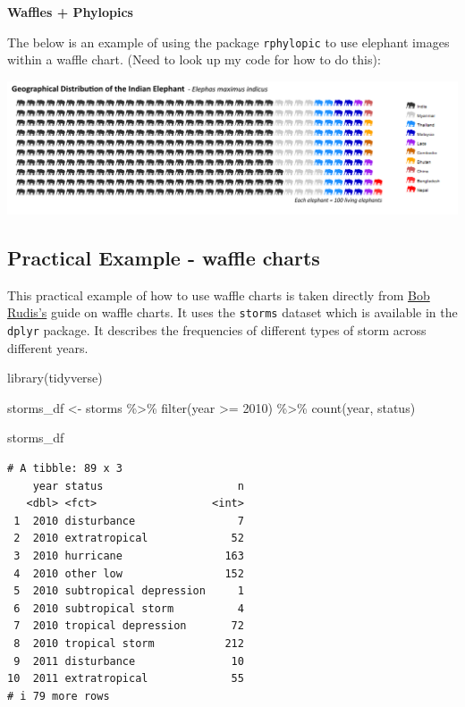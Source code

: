 \documentclass[
  letterpaper,
  DIV=11,
  numbers=noendperiod]{scrreprt}
\newenvironment{Shaded}{\begin{snugshade}}{\end{snugshade}}
\newcommand{\DecValTok}[1]{\textcolor[rgb]{0.68,0.00,0.00}{#1}}
\newcommand{\FunctionTok}[1]{\textcolor[rgb]{0.28,0.35,0.67}{#1}}
\newcommand{\NormalTok}[1]{\textcolor[rgb]{0.00,0.23,0.31}{#1}}
\newcommand{\OtherTok}[1]{\textcolor[rgb]{0.00,0.23,0.31}{#1}}
\newcommand{\SpecialCharTok}[1]{\textcolor[rgb]{0.37,0.37,0.37}{#1}}
\begin{document}
\textbf{Waffles + Phylopics}

The below is an example of using the package \texttt{rphylopic} to use
elephant images within a waffle chart. (Need to look up my code for how
to do this):

\includegraphics{./img/elephant.png}

\hypertarget{practical-example---waffle-charts}{%
\subsection{Practical Example - waffle
charts}\label{practical-example---waffle-charts}}

This practical example of how to use waffle charts is taken directly
from \href{https://rud.is/rpubs/building-waffle-charts.html}{Bob
Rudis's} guide on waffle charts. It uses the \texttt{storms} dataset
which is available in the \texttt{dplyr} package. It describes the
frequencies of different types of storm across different years.

\begin{Shaded}
\begin{Highlighting}[]
\FunctionTok{library}\NormalTok{(tidyverse)}

\NormalTok{storms\_df }\OtherTok{\textless{}{-}}\NormalTok{ storms }\SpecialCharTok{\%\textgreater{}\%}
  \FunctionTok{filter}\NormalTok{(year }\SpecialCharTok{\textgreater{}=} \DecValTok{2010}\NormalTok{) }\SpecialCharTok{\%\textgreater{}\%}
  \FunctionTok{count}\NormalTok{(year, status) }

\NormalTok{storms\_df}
\end{Highlighting}
\end{Shaded}

\begin{verbatim}
# A tibble: 89 x 3
    year status                     n
   <dbl> <fct>                  <int>
 1  2010 disturbance                7
 2  2010 extratropical             52
 3  2010 hurricane                163
 4  2010 other low                152
 5  2010 subtropical depression     1
 6  2010 subtropical storm          4
 7  2010 tropical depression       72
 8  2010 tropical storm           212
 9  2011 disturbance               10
10  2011 extratropical             55
# i 79 more rows
\end{verbatim}
\end{document}

